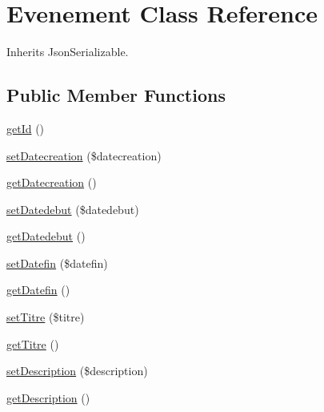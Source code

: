 \hypertarget{class_site_1_1_trail_bundle_1_1_entity_1_1_evenement}{}\section{Evenement Class Reference}
\label{class_site_1_1_trail_bundle_1_1_entity_1_1_evenement}


Inherits Json\+Serializable.

\subsection*{Public Member Functions}
\begin{DoxyCompactItemize}
\item 
\hyperlink{class_site_1_1_trail_bundle_1_1_entity_1_1_evenement_a12251d0c022e9e21c137a105ff683f13}{get\+Id} ()
\item 
\hyperlink{class_site_1_1_trail_bundle_1_1_entity_1_1_evenement_a1749554fae4c73cc3836b9ac2f02c73e}{set\+Datecreation} (\$datecreation)
\item 
\hyperlink{class_site_1_1_trail_bundle_1_1_entity_1_1_evenement_a586442e7ccf6b3534c0a3813b4a164e7}{get\+Datecreation} ()
\item 
\hyperlink{class_site_1_1_trail_bundle_1_1_entity_1_1_evenement_ac062ae5a78192efec2efad709ddc2f92}{set\+Datedebut} (\$datedebut)
\item 
\hyperlink{class_site_1_1_trail_bundle_1_1_entity_1_1_evenement_a2b4cb39040dc1668752c386f7e0de9f8}{get\+Datedebut} ()
\item 
\hyperlink{class_site_1_1_trail_bundle_1_1_entity_1_1_evenement_ac2316991e01e8610e62550e867e6eaf6}{set\+Datefin} (\$datefin)
\item 
\hyperlink{class_site_1_1_trail_bundle_1_1_entity_1_1_evenement_a6b6b9d54df6d0cc9385b794e1ecc5865}{get\+Datefin} ()
\item 
\hyperlink{class_site_1_1_trail_bundle_1_1_entity_1_1_evenement_a1d7b0177b6a719345b3a99ec2b48c5a0}{set\+Titre} (\$titre)
\item 
\hyperlink{class_site_1_1_trail_bundle_1_1_entity_1_1_evenement_a11c380e71778af9871c5bd84b2f50eae}{get\+Titre} ()
\item 
\hyperlink{class_site_1_1_trail_bundle_1_1_entity_1_1_evenement_a31fad3e39336ea079ea758e051866627}{set\+Description} (\$description)
\item 
\hyperlink{class_site_1_1_trail_bundle_1_1_entity_1_1_evenement_a2e7bb35c71bf1824456ceb944cb7a845}{get\+Description} ()
\item 

\end{DoxyCompactItemize}
